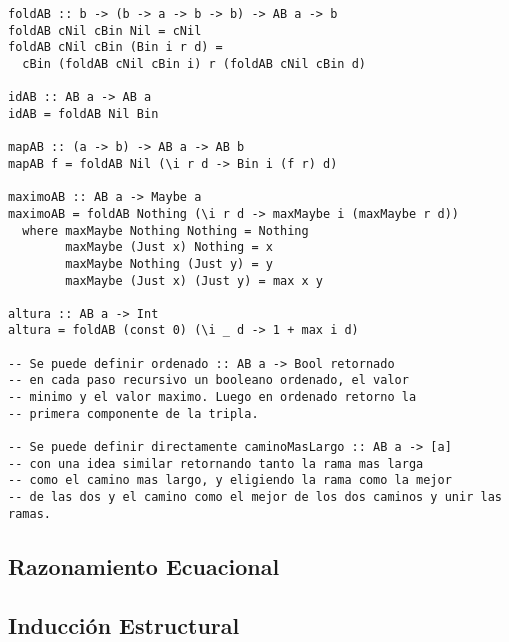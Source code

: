 \documentclass[12pt]{extarticle}
\begin{document}
\begin{verbatim}
foldAB :: b -> (b -> a -> b -> b) -> AB a -> b
foldAB cNil cBin Nil = cNil
foldAB cNil cBin (Bin i r d) =
  cBin (foldAB cNil cBin i) r (foldAB cNil cBin d)

idAB :: AB a -> AB a
idAB = foldAB Nil Bin

mapAB :: (a -> b) -> AB a -> AB b
mapAB f = foldAB Nil (\i r d -> Bin i (f r) d)

maximoAB :: AB a -> Maybe a
maximoAB = foldAB Nothing (\i r d -> maxMaybe i (maxMaybe r d))
  where maxMaybe Nothing Nothing = Nothing
        maxMaybe (Just x) Nothing = x
        maxMaybe Nothing (Just y) = y
        maxMaybe (Just x) (Just y) = max x y

altura :: AB a -> Int
altura = foldAB (const 0) (\i _ d -> 1 + max i d)

-- Se puede definir ordenado :: AB a -> Bool retornado
-- en cada paso recursivo un booleano ordenado, el valor
-- minimo y el valor maximo. Luego en ordenado retorno la
-- primera componente de la tripla.

-- Se puede definir directamente caminoMasLargo :: AB a -> [a]
-- con una idea similar retornando tanto la rama mas larga
-- como el camino mas largo, y eligiendo la rama como la mejor
-- de las dos y el camino como el mejor de los dos caminos y unir las ramas.
\end{verbatim}

\subsection{Razonamiento Ecuacional}
\subsection{Inducción Estructural}

%
\end{document}
